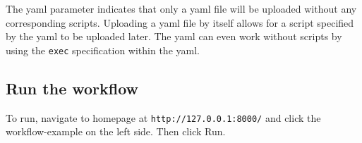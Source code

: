 The yaml parameter indicates that only a yaml file will be uploaded
without any corresponding scripts. Uploading a yaml file by itself
allows for a script specified by the yaml to be uploaded later. The yaml
can even work without scripts by using the \texttt{exec} specification
within the yaml.

\subsection{Run the workflow}\label{run-the-workflow}

To run, navigate to homepage at \texttt{http://127.0.0.1:8000/} and
click the workflow-example on the left side. Then click Run.
